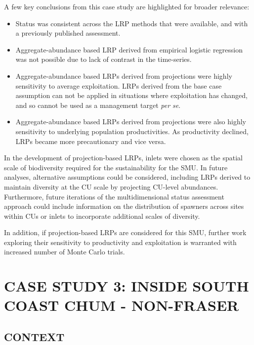 \documentclass[11pt]{book}
\begin{document}
A few key conclusions from this case study are highlighted for broader relevance:
\begin{itemize}
\item
  Status was consistent across the LRP methods that were available, and with a previously published assessment.
\item
  Aggregate-abundance based LRP derived from empirical logistic regression was not possible due to lack of contrast in the time-series.
\item
  Aggregate-abundance based LRPs derived from projections were highly sensitivity to average exploitation. LRPs derived from the base case assumption can not be applied in situations where exploitation has changed, and so cannot be used as a management target \emph{per se}.
\item
  Aggregate-abundance based LRPs derived from projections were also highly sensitivity to underlying population productivities. As productivity declined, LRPs became more precautionary and vice versa.
\end{itemize}
In the development of projection-based LRPs, inlets were chosen as the spatial scale of biodiversity required for the sustainability for the SMU. In future analyses, alternative assumptions could be considered, including LRPs derived to maintain diversity at the CU scale by projecting CU-level abundances. Furthermore, future iterations of the multidimensional status assessment approach could include information on the distribution of spawners across sites within CUs or inlets to incorporate additional scales of diversity.

In addition, if projection-based LRPs are considered for this SMU, further work exploring their sensitivity to productivity and exploitation is warranted with increased number of Monte Carlo trials.

\hypertarget{ISCchumChapter}{%
\section{CASE STUDY 3: INSIDE SOUTH COAST CHUM - NON-FRASER}\label{ISCchumChapter}}

\hypertarget{context-2}{%
\subsection{CONTEXT}\label{context-2}}
\end{document}
